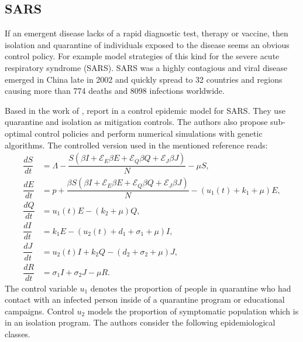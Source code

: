 
\subsection*{SARS}
  If an emergent disease lacks of a rapid diagnostic test, therapy or vaccine,
then isolation and quarantine of individuals exposed to the disease
seems an obvious control policy. For example \citet{Gumel2004} model
strategies of this kind for the severe acute respiratory syndrome (SARS).
SARS was a highly contagious and viral disease emerged in China late in 
\num{2002}  and quickly spread to \num{32} countries and regions causing more than \num{774} deaths and \num{8098} infections worldwide.

Based in the work of \citet{Gumel2004}, \citeauthor{Yan2008} report in 
\cite{Yan2008} a control epidemic model for SARS. They use quarantine and 
isolation as mitigation controls. The authors also propose sub-optimal control 
policies and perform numerical simulations with genetic algorithms. The 
controlled version used in the mentioned 
reference reads:
%
%
\begin{equation}\label{eqn:sars_model}
	\begin{aligned}
		\dfrac{dS}{dt} &=
			\Lambda 
			-\dfrac{
				S
				\left(
					\beta I 
					+ \mathcal{E}_E  \beta E
					+ \mathcal{E}_Q  \beta Q
					+ \mathcal{E}_J  \beta J
				\right)
			}{N}
			- \mu S,
		\\
		\dfrac{dE}{dt} &=
			p +
			\dfrac{
				\beta S
				\left(
					\beta I 
						+ \mathcal{E}_E \beta E
						+ \mathcal{E}_Q \beta Q
						+ \mathcal{E}_J \beta J
				\right)
			}{N}
			-(
				u_1(t) + k_1 + \mu
			)E,
		\\
		\dfrac{dQ}{dt} &=
			u_1(t) E 
			- (k_2 + \mu) Q,
		\\
		\dfrac{dI}{dt} &=
			k_1 E 
			-(u_2(t) + d_1  + \sigma_1 + \mu) I,
		\\
		\dfrac{dJ}{dt} &=
			u_2(t) I 
			+ k_2 Q
			- (d_2 + \sigma_2 + \mu) J,
		\\
		\dfrac{dR}{dt} &=
			\sigma_1 I
			+\sigma_2 J
			- \mu R.
	\end{aligned}
\end{equation}
The control variable $u_1$ denotes the proportion of people in quarantine 
who had contact with an infected person inside of a quarantine program or
educational campaigns. Control $u_2$ models the proportion of symptomatic 
population which is in an isolation program. The authors consider the 
following epidemiological classes.
